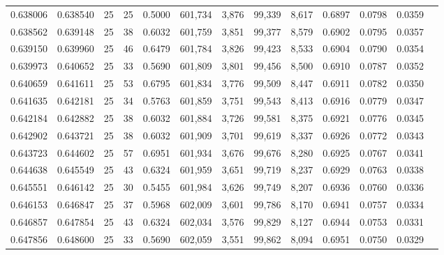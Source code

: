 \begin{tabular}{rrrrrrrrrrrrr}
0.638006 & 0.638540 &    25 &  25 &                                     0.5000 & 601,734 &   3,876 &  99,339 &   8,617 & 0.6897 & 0.0798 & 0.0359 \\
0.638562 & 0.639148 &    25 &  38 &                                     0.6032 & 601,759 &   3,851 &  99,377 &   8,579 & 0.6902 & 0.0795 & 0.0357 \\
0.639150 & 0.639960 &    25 &  46 &                                     0.6479 & 601,784 &   3,826 &  99,423 &   8,533 & 0.6904 & 0.0790 & 0.0354 \\
0.639973 & 0.640652 &    25 &  33 &                                     0.5690 & 601,809 &   3,801 &  99,456 &   8,500 & 0.6910 & 0.0787 & 0.0352 \\
0.640659 & 0.641611 &    25 &  53 &                                     0.6795 & 601,834 &   3,776 &  99,509 &   8,447 & 0.6911 & 0.0782 & 0.0350 \\
0.641635 & 0.642181 &    25 &  34 &                                     0.5763 & 601,859 &   3,751 &  99,543 &   8,413 & 0.6916 & 0.0779 & 0.0347 \\
0.642184 & 0.642882 &    25 &  38 &                                     0.6032 & 601,884 &   3,726 &  99,581 &   8,375 & 0.6921 & 0.0776 & 0.0345 \\
0.642902 & 0.643721 &    25 &  38 &                                     0.6032 & 601,909 &   3,701 &  99,619 &   8,337 & 0.6926 & 0.0772 & 0.0343 \\
0.643723 & 0.644602 &    25 &  57 &                                     0.6951 & 601,934 &   3,676 &  99,676 &   8,280 & 0.6925 & 0.0767 & 0.0341 \\
0.644638 & 0.645549 &    25 &  43 &                                     0.6324 & 601,959 &   3,651 &  99,719 &   8,237 & 0.6929 & 0.0763 & 0.0338 \\
0.645551 & 0.646142 &    25 &  30 &                                     0.5455 & 601,984 &   3,626 &  99,749 &   8,207 & 0.6936 & 0.0760 & 0.0336 \\
0.646153 & 0.646847 &    25 &  37 &                                     0.5968 & 602,009 &   3,601 &  99,786 &   8,170 & 0.6941 & 0.0757 & 0.0334 \\
0.646857 & 0.647854 &    25 &  43 &                                     0.6324 & 602,034 &   3,576 &  99,829 &   8,127 & 0.6944 & 0.0753 & 0.0331 \\
0.647856 & 0.648600 &    25 &  33 &                                     0.5690 & 602,059 &   3,551 &  99,862 &   8,094 & 0.6951 & 0.0750 & 0.0329 \\

\end{tabular}

